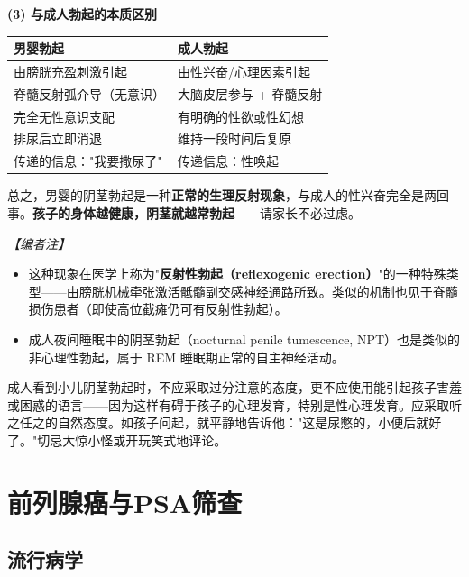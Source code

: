 \vspace{0.3em}
\noindent\textbf{(3) 与成人勃起的本质区别}

\begin{tabular}{|p{5cm}|p{6cm}|}
\hline
\textbf{男婴勃起} & \textbf{成人勃起} \\
\hline
由膀胱充盈刺激引起 & 由性兴奋/心理因素引起 \\
\hline
脊髓反射弧介导（无意识） & 大脑皮层参与 + 脊髓反射 \\
\hline
完全无性意识支配 & 有明确的性欲或性幻想 \\
\hline
排尿后立即消退 & 维持一段时间后复原 \\
\hline
传递的信息："我要撒尿了" & 传递信息：性唤起 \\
\hline
\end{tabular}

总之，男婴的阴茎勃起是一种\textbf{正常的生理反射现象}，与成人的性兴奋完全是两回事。\textbf{孩子的身体越健康，阴茎就越常勃起}——请家长不必过虑。

\vspace{0.3em}
\noindent\textit{【编者注】}
\begin{itemize}
	\item 这种现象在医学上称为"\textbf{反射性勃起（reflexogenic erection）}"的一种特殊类型——由膀胱机械牵张激活骶髓副交感神经通路所致。类似的机制也见于脊髓损伤患者（即使高位截瘫仍可有反射性勃起）。
	\item 成人夜间睡眠中的阴茎勃起（nocturnal penile tumescence, NPT）也是类似的非心理性勃起，属于 REM 睡眠期正常的自主神经活动。
\end{itemize}

\begin{tcolorbox}[colback=pink!5!white,colframe=red!50!black,title=贴心小叮咛]
成人看到小儿阴茎勃起时，不应采取过分注意的态度，更不应使用能引起孩子害羞或困惑的语言——因为这样有碍于孩子的心理发育，特别是性心理发育。应采取听之任之的自然态度。如孩子问起，就平静地告诉他："这是尿憋的，小便后就好了。"切忌大惊小怪或开玩笑式地评论。
\end{tcolorbox}

\section{前列腺癌与PSA筛查}
\label{sec:prostate_cancer}

\subsection{流行病学}

